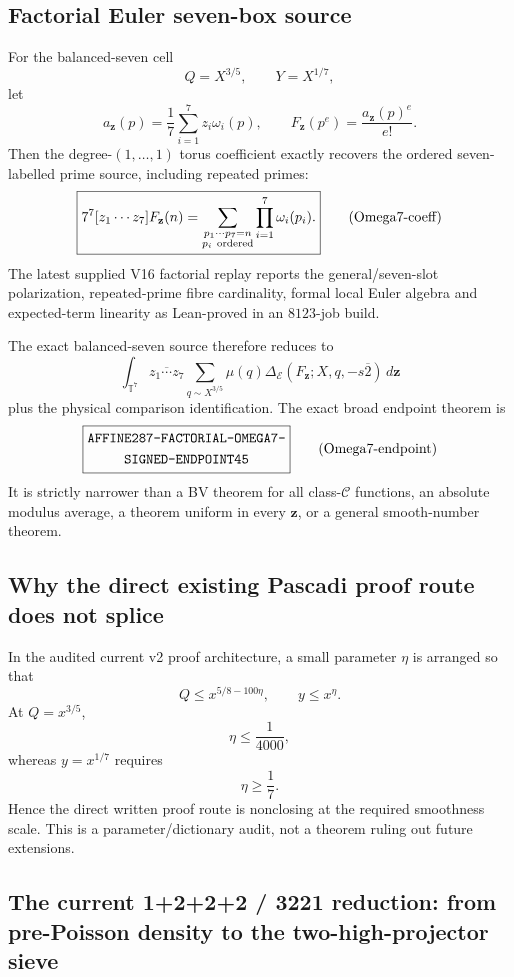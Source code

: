 \documentclass[11pt]{article}
\theoremstyle{definition}
\newcommand{\1}{\mathbf 1}
\begin{document}
\subsection{Factorial Euler seven-box source}

For the balanced-seven cell
\[
Q=X^{3/5},\qquad Y=X^{1/7},
\]
let
\[
a_{\mathbf z}(p)=\frac17\sum_{i=1}^7z_i\omega_i(p),
\qquad
\boxed{
F_{\mathbf z}(p^e)=\frac{a_{\mathbf z}(p)^e}{e!}.
}
\tag{Omega7-factorial}
\]
Then the degree-$(1,\ldots,1)$ torus coefficient exactly recovers the ordered seven-labelled
prime source, including repeated primes:
\[
\boxed{
7^7[z_1\cdots z_7]F_{\mathbf z}(n)
=
\sum_{\substack{p_1\cdots p_7=n\\p_i\ {\rm ordered}}}
\prod_{i=1}^7\omega_i(p_i).
}
\tag{Omega7-coeff}
\]
The latest supplied V16 factorial replay reports the general/seven-slot polarization,
repeated-prime fibre cardinality, formal local Euler algebra and expected-term linearity as
Lean-proved in an $8123$-job build.

The exact balanced-seven source therefore reduces to
\[
\int_{\mathbb T^7}\overline{z_1\cdots z_7}
\sum_{q\sim X^{3/5}}\mu(q)
\Delta_{\mathcal E}(F_{\mathbf z};X,q,-s\overline2)\,d\mathbf z
\]
plus the physical comparison identification.  The exact broad endpoint theorem is
\[
\boxed{\begin{gathered}\text{\ttfamily AFFINE287-FACTORIAL-OMEGA7-}\\\text{\ttfamily SIGNED-ENDPOINT45}\end{gathered}}
\tag{Omega7-endpoint}
\]
It is strictly narrower than a BV theorem for all class-$\mathcal C$ functions, an
absolute modulus average, a theorem uniform in every $\mathbf z$, or a general
smooth-number theorem.

\subsection{Why the direct existing Pascadi proof route does not splice}

In the audited current v2 proof architecture, a small parameter $\eta$ is arranged so that
\[
Q\le x^{5/8-100\eta},
\qquad
y\le x^\eta.
\]
At $Q=x^{3/5}$,
\[
\eta\le\frac1{4000},
\]
whereas $y=x^{1/7}$ requires
\[
\eta\ge\frac17.
\]
Hence the direct written proof route is nonclosing at the required smoothness scale.  This is
a parameter/dictionary audit, not a theorem ruling out future extensions.

\subsection{The current 1+2+2+2 / 3221 reduction:
from pre-Poisson density to the two-high-projector sieve}
\end{document}
